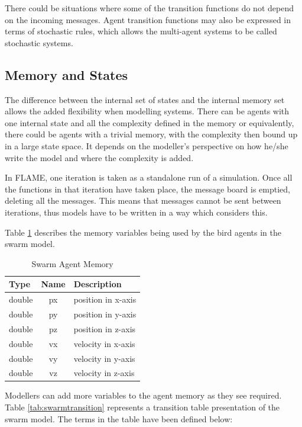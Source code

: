 \documentclass[a4paper,11pt]{article}
\begin{document}
There could be situations where some of the transition functions do
not depend on the incoming
 messages. Agent transition functions may also be expressed in terms of
 stochastic rules, which allows the multi-agent systems to be called stochastic systems.

 \subsection{Memory and States}
 The difference between the internal set of states and the internal
 memory set allows the added flexibility when modelling systems.
 There can be agents with one internal state and all the complexity
 defined in the memory or equivalently, there could be agents with
 a trivial memory, with the complexity then bound up in a large state
 space. It depends on the modeller's perspective on how he/she write the model and where the complexity is added.

In FLAME, one iteration is taken as a standalone run of a
simulation. Once all the functions in that iteration have taken
place, the message board is emptied, deleting all the messages. This
means that messages cannot be sent between iterations, thus models
have to be written in a way which considers this.

Table \ref{tab:swarm_memory} describes the memory variables being
used by the bird agents in the swarm model.


\begin{table}[ht]
\centering
\begin{tabular}{|l||c||l|}
\hline
Type&Name&Description\\
\hline \hline
double&px&position in x-axis\\
\hline
double&py&position in y-axis\\
\hline
double&pz&position in z-axis\\
\hline
double&vx&velocity in x-axis\\
\hline
double&vy&velocity in y-axis\\
\hline
double&vz&velocity in z-axis\\
\hline
\end{tabular}
\caption{Swarm Agent Memory} \label{tab:swarm_memory}
\end{table}

Modellers can add more variables to the agent memory as they see
required. Table \ref{tab:swarmtransition} represents a transition
table presentation of the swarm model. The terms in the table have
been defined below:
\end{document}
